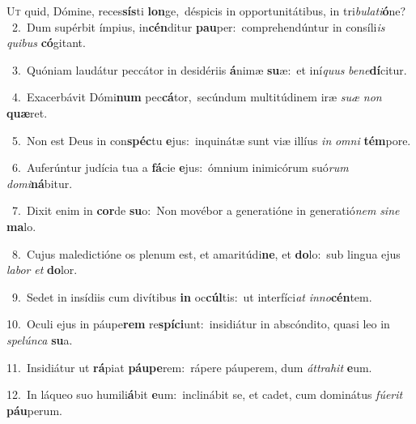 \lettrine{\initial\textcolor{\initialcolor}{U}}{t} quid, Dómine, reces\-\textbf{sís}\-ti \textbf{lon}\-ge,~\star déspicis in opportunitátibus, in tri\-\textit{bu}\-\textit{la}\textit{ti}\textbf{ó}ne?\\
{\numbfont\textcolor{\numbcolor}{~2.}}~Dum supérbit ímpius, in\-\textbf{cén}\-ditur \textbf{pau}\-per:~\star comprehendúntur in consíli\textit{is} \textit{qui}\-\textit{bus} \textbf{có}\-gitant.\par
{\numbfont\textcolor{\numbcolor}{~3.}}~Quóniam laudátur peccátor in desidériis \textbf{á}\-nimæ \textbf{su}\-æ:~\star et iní\textit{quus} \textit{be}\-\textit{ne}\textbf{dí}citur.\par
{\numbfont\textcolor{\numbcolor}{~4.}}~Exacerbávit Dómi\textbf{num} pec\-\textbf{cá}\-tor,~\star secúndum multitúdinem iræ \textit{su}\-\textit{æ} \textit{non} \textbf{quæ}\-ret.\par
{\numbfont\textcolor{\numbcolor}{~5.}}~Non est Deus in con\-\textbf{spéc}\-tu \textbf{e}\-jus:~\star inquinátæ sunt viæ illíus \textit{in} \textit{om}\-\textit{ni} \textbf{tém}\-pore.\par
{\numbfont\textcolor{\numbcolor}{~6.}}~Auferúntur judícia tua a \textbf{fá}\-cie \textbf{e}\-jus:~\star ómnium inimicórum suó\textit{rum} \textit{do}\-\textit{mi}\textbf{ná}bitur.\par
{\numbfont\textcolor{\numbcolor}{~7.}}~Dixit enim in \textbf{cor}\-de \textbf{su}\-o:~\star Non movébor a generatióne in generatió\textit{nem} \textit{si}\-\textit{ne} \textbf{ma}\-lo.\par
{\numbfont\textcolor{\numbcolor}{~8.}}~Cujus maledictióne os plenum est, et amaritúdi\-\textbf{ne}\-, et \textbf{do}\-lo:~\star sub lingua ejus \textit{la}\-\textit{bor} \textit{et} \textbf{do}\-lor.\par
{\numbfont\textcolor{\numbcolor}{~9.}}~Sedet in insídiis cum divítibus \textbf{in} oc\-\textbf{cúl}\-tis:~\star ut interfíci\textit{at} \textit{in}\-\textit{no}\textbf{cén}tem.\par
{\numbfont\textcolor{\numbcolor}{10.}}~Oculi ejus in páupe\textbf{rem} re\-\textbf{spí}\-\textbf{ci}unt:~\star insidiátur in abscóndito, quasi leo in \textit{spe}\-\textit{lún}\textit{ca} \textbf{su}\-a.\par
{\numbfont\textcolor{\numbcolor}{11.}}~Insidiátur ut \textbf{rá}\-piat \textbf{páu}\-\textbf{pe}rem:~\star rápere páuperem, dum \textit{át}\-\textit{tra}\textit{hit} \textbf{e}\-um.\par
{\numbfont\textcolor{\numbcolor}{12.}}~In láqueo suo humili\-\textbf{á}\-bit \textbf{e}\-um:~\star inclinábit se, et cadet, cum dominátus \textit{fú}\-\textit{e}\textit{rit} \textbf{páu}\-perum.\par
